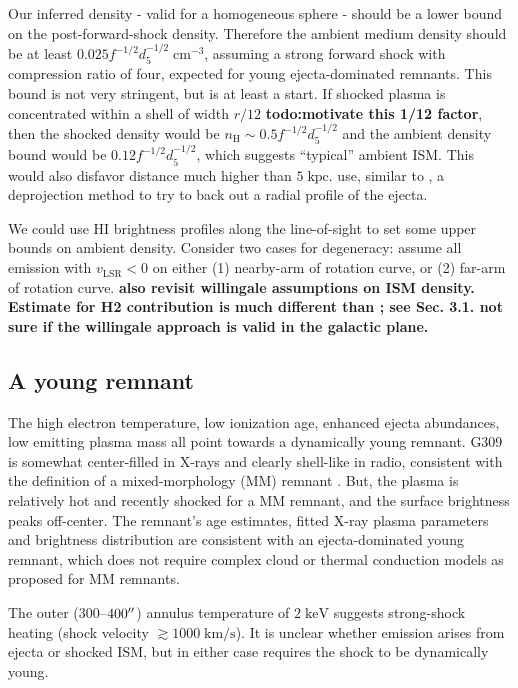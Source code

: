 \documentclass[preprint2,tighten,trackchanges]{aastex6}
\newcommand*{\mt}{\mathrm}
\newcommand*{\unit}[1]{\;\mt{#1}}  %
\begin{document}
Our inferred density - valid for a homogeneous sphere - should be a lower bound
on the post-forward-shock density.
Therefore the ambient medium density should be at least
$0.025 f^{-1/2} d_{5}^{-1/2} \unit{cm^{-3}}$, assuming a strong forward shock
with compression ratio of four, expected for young ejecta-dominated remnants.
This bound is not very stringent, but is at least a start.
If shocked plasma is concentrated within a shell of width $r/12$
\textbf{todo:motivate this 1/12 factor}, then the shocked density would be
$n_{\mt{H}} \sim 0.5 f^{-1/2} d_{5}^{-1/2}$
and the ambient density bound would be $0.12 f^{-1/2} d_{5}^{-1/2}$,
which suggests ``typical'' ambient ISM.
This would also disfavor distance much higher than $5 \unit{kpc}$.
\citet{katsuda2015} use, similar to \citet{kosenko2010}, a deprojection method
to try to back out a radial profile of the ejecta.

We could use HI brightness profiles along the line-of-sight to set some upper
bounds on ambient density.
Consider two cases for degeneracy: assume all emission with $v_{\mt{LSR}} < 0$
on either (1) nearby-arm of rotation curve, or (2) far-arm of rotation curve.
\textbf{also revisit willingale assumptions on ISM density.  Estimate for H2
contribution is much different than \citet{yamaguchi2012}; see Sec. 3.1.
not sure if the willingale approach is valid in the galactic plane.}

\subsection{A young remnant}

The high electron temperature, low ionization age, enhanced ejecta abundances,
low emitting plasma mass all point towards a dynamically young remnant.
G309 is somewhat center-filled in X-rays and clearly shell-like in radio,
consistent with the definition of a mixed-morphology (MM) remnant
\citep{rho1998}.
But, the plasma is relatively hot and recently shocked for a MM remnant, and
the surface brightness peaks off-center.
The remnant's age estimates, fitted X-ray plasma parameters and brightness
distribution are consistent with an ejecta-dominated young remnant, which
does not require complex cloud or thermal conduction models as proposed for MM
remnants.

The outer ($300$--$400\mbox{$^{\prime\prime}$}$) annulus temperature of $2 \unit{keV}$
suggests strong-shock heating (shock velocity $\gtrsim 1000 \unit{km/s}$).
It is unclear whether emission arises from ejecta or shocked ISM, but in either
case requires the shock to be dynamically young.
\end{document}
